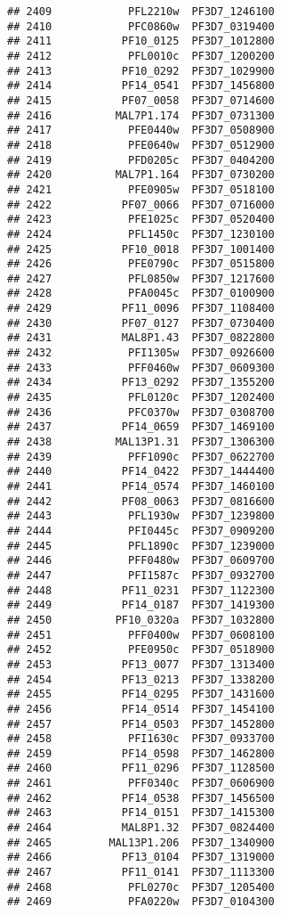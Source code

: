 \documentclass[12pt, a4paper]{article}\usepackage[]{graphicx}\usepackage[]{color}
\makeatletter
\newenvironment{kframe}{%
 \def\at@end@of@kframe{}%
 \ifinner\ifhmode%
  \def\at@end@of@kframe{\end{minipage}}%
  \begin{minipage}{\columnwidth}%
 \fi\fi%
 \def\FrameCommand##1{\hskip\@totalleftmargin \hskip-\fboxsep
 \colorbox{shadecolor}{##1}\hskip-\fboxsep
     \hskip-\linewidth \hskip-\@totalleftmargin \hskip\columnwidth}%
 \MakeFramed {\advance\hsize-\width
   \@totalleftmargin\z@ \linewidth\hsize
   \@setminipage}}%
 {\par\unskip\endMakeFramed%
 \at@end@of@kframe}
\newenvironment{knitrout}{}{} %
\makeatother
\begin{document}
\begin{knitrout}
\begin{kframe}
\begin{verbatim}
## 2409            PFL2210w  PF3D7_1246100
## 2410            PFC0860w  PF3D7_0319400
## 2411           PF10_0125  PF3D7_1012800
## 2412            PFL0010c  PF3D7_1200200
## 2413           PF10_0292  PF3D7_1029900
## 2414           PF14_0541  PF3D7_1456800
## 2415           PF07_0058  PF3D7_0714600
## 2416          MAL7P1.174  PF3D7_0731300
## 2417            PFE0440w  PF3D7_0508900
## 2418            PFE0640w  PF3D7_0512900
## 2419            PFD0205c  PF3D7_0404200
## 2420          MAL7P1.164  PF3D7_0730200
## 2421            PFE0905w  PF3D7_0518100
## 2422           PF07_0066  PF3D7_0716000
## 2423            PFE1025c  PF3D7_0520400
## 2424            PFL1450c  PF3D7_1230100
## 2425           PF10_0018  PF3D7_1001400
## 2426            PFE0790c  PF3D7_0515800
## 2427            PFL0850w  PF3D7_1217600
## 2428            PFA0045c  PF3D7_0100900
## 2429           PF11_0096  PF3D7_1108400
## 2430           PF07_0127  PF3D7_0730400
## 2431           MAL8P1.43  PF3D7_0822800
## 2432            PFI1305w  PF3D7_0926600
## 2433            PFF0460w  PF3D7_0609300
## 2434           PF13_0292  PF3D7_1355200
## 2435            PFL0120c  PF3D7_1202400
## 2436            PFC0370w  PF3D7_0308700
## 2437           PF14_0659  PF3D7_1469100
## 2438          MAL13P1.31  PF3D7_1306300
## 2439            PFF1090c  PF3D7_0622700
## 2440           PF14_0422  PF3D7_1444400
## 2441           PF14_0574  PF3D7_1460100
## 2442           PF08_0063  PF3D7_0816600
## 2443            PFL1930w  PF3D7_1239800
## 2444            PFI0445c  PF3D7_0909200
## 2445            PFL1890c  PF3D7_1239000
## 2446            PFF0480w  PF3D7_0609700
## 2447            PFI1587c  PF3D7_0932700
## 2448           PF11_0231  PF3D7_1122300
## 2449           PF14_0187  PF3D7_1419300
## 2450          PF10_0320a  PF3D7_1032800
## 2451            PFF0400w  PF3D7_0608100
## 2452            PFE0950c  PF3D7_0518900
## 2453           PF13_0077  PF3D7_1313400
## 2454           PF13_0213  PF3D7_1338200
## 2455           PF14_0295  PF3D7_1431600
## 2456           PF14_0514  PF3D7_1454100
## 2457           PF14_0503  PF3D7_1452800
## 2458            PFI1630c  PF3D7_0933700
## 2459           PF14_0598  PF3D7_1462800
## 2460           PF11_0296  PF3D7_1128500
## 2461            PFF0340c  PF3D7_0606900
## 2462           PF14_0538  PF3D7_1456500
## 2463           PF14_0151  PF3D7_1415300
## 2464           MAL8P1.32  PF3D7_0824400
## 2465         MAL13P1.206  PF3D7_1340900
## 2466           PF13_0104  PF3D7_1319000
## 2467           PF11_0141  PF3D7_1113300
## 2468            PFL0270c  PF3D7_1205400
## 2469            PFA0220w  PF3D7_0104300

\end{verbatim}
\end{kframe}
\end{knitrout}
\end{document}
